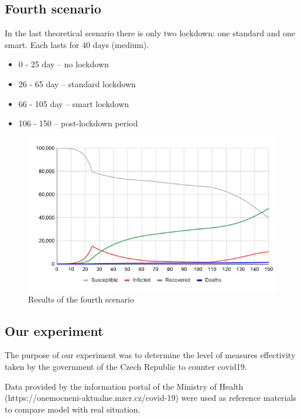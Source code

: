 \documentclass[12pt,a4paper,english]{article}
\begin{document}
    \subsection{Fourth scenario}
    \label{fourth_scenario}
    In the last theoretical scenario there is only two lockdown: one standard and one smart.
    Each lasts for 40 days (medium).
    \begin{itemize}
        \item 0 - 25 day -- no lockdown
        \item 26 - 65 day -- standard lockdown 
        \item 66 - 105 day -- smart lockdown
        \item 106 - 150 -- post-lockdown period
    \end{itemize}
    \begin{figure}[h!]
        \centering
        \includegraphics[scale=0.55]{med+smart.png}
        \caption{Results of the fourth scenario}
    \end{figure}
    
    \newpage
    \subsection{Our experiment}

    The purpose of our experiment was to determine the level of measures effectivity  taken by the government of the Czech Republic to counter covid19.
    
    Data provided by the information portal of the Ministry of Health (https://onemocneni-aktualne.mzcr.cz/covid-19) 
    were used as reference materials to compare model with real situation.
    
\end{document}
